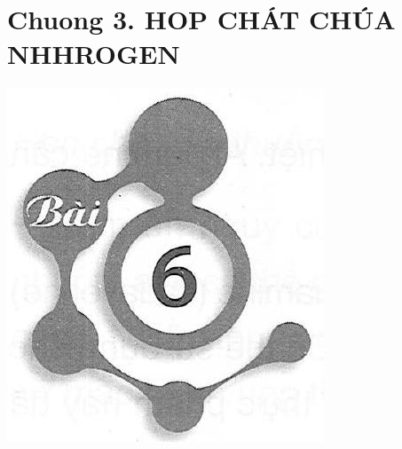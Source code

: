 \documentclass[10pt]{article}
\begin{document}
\section*{Chuong 3. HOP CHÁT CHÚA NHHROGEN}
\begin{center}
\includegraphics[max width=\textwidth]{2025_10_23_b4e16b74380d0f7e7700g-046}
\end{center}
\end{document}
